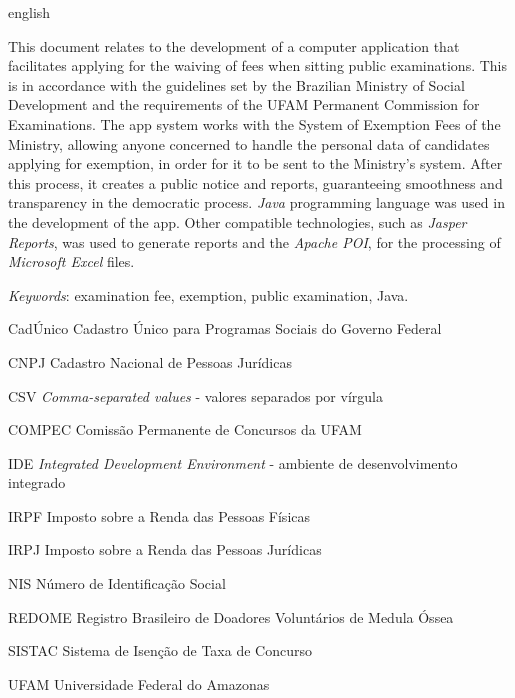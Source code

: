 \documentclass[
	12pt,			%
	openright,		%
	oneside,	
	a4paper,		%
	english,		%
	brazil			%
]{abntex2/abntex2}  %
\begin{document}
	\begin{abstracteng}[Abstract]
		\begin{otherlanguage*}{english}
		
			This document relates to the development of a computer application that facilitates applying for the waiving of fees when sitting public examinations. This is in accordance with the guidelines set by the Brazilian Ministry of Social Development and the requirements of the UFAM Permanent Commission for Examinations. The app system works with the System of Exemption Fees of the Ministry, allowing anyone concerned to handle the personal data of candidates applying for exemption, in order for it to be sent to the Ministry's system. After this process, it creates a public notice and reports, guaranteeing smoothness and transparency in the democratic process. \textit{Java} programming language was used in the development of the app. Other compatible technologies, such as \textit{Jasper Reports}, was used to generate reports and the \textit{Apache POI}, for the processing of \textit{Microsoft Excel} files.

			\vspace{\onelineskip}
			\noindent
			\textit{Keywords}: examination fee, exemption, public examination, Java.
	
		\end{otherlanguage*}
	\end{abstracteng}

	\listoffigures*
	\cleardoublepage

	\listoftables*
	\cleardoublepage

	\begin{siglas}

		\item[CadÚnico] Cadastro Único para Programas Sociais do Governo Federal
		\item[CNPJ] Cadastro Nacional de Pessoas Jurídicas
		\item[CSV] \textit{Comma-separated values} - valores separados por vírgula
		\item[COMPEC] Comissão Permanente de Concursos da UFAM
		\item[IDE] \textit{Integrated Development Environment} - ambiente de desenvolvimento integrado
		\item[IRPF] Imposto sobre a Renda das Pessoas Físicas
		\item[IRPJ] Imposto sobre a Renda das Pessoas Jurídicas
		\item[NIS] Número de Identificação Social
		\item[REDOME] Registro Brasileiro de Doadores Voluntários de Medula Óssea
		\item[SISTAC] Sistema de Isenção de Taxa de Concurso
		\item[UFAM] Universidade Federal do Amazonas

	\end{siglas}
\end{document}
